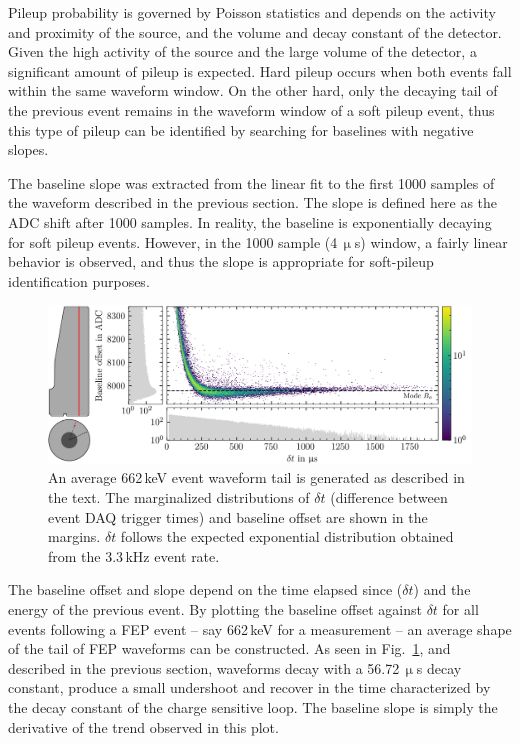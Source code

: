 Pileup probability is governed by Poisson statistics and depends on the activity and proximity of the source, and the volume and decay constant of the detector. Given the high activity of the \CsS{} source and the large volume of the detector, a significant amount of pileup is expected. Hard pileup occurs when both events fall within the same waveform window. On the other hard, only the decaying tail of the previous event remains in the waveform window of a soft pileup event, thus this type of pileup can be identified by searching for baselines with negative slopes.

The baseline slope was extracted from the linear fit to the first 1000 samples of the waveform described in the previous section. The slope is defined here as the ADC shift after 1000 samples. In reality, the baseline is exponentially decaying for soft pileup events. However, in the 1000 sample (4\,$\upmu$s) window, a fairly linear behavior is observed, and thus the slope is appropriate for soft-pileup identification purposes. 
\begin{figure}[htb]
    \centering
    \includegraphics[width=6in]{figs/param/dt_offset_maginalized_6_9in.png}
    \caption{An average 662\,keV event waveform tail is generated as described in the text. The marginalized distributions of $\delta t$ (difference between event DAQ trigger times) and baseline offset are shown in the margins. $\delta t$ follows the expected exponential distribution obtained from the 3.3\,kHz event rate.}
    \label{fig:time_vs_offset}
\end{figure}

The baseline offset and slope depend on the time elapsed since ($\delta t$) and the energy of the previous event. By plotting the baseline offset against $\delta t$ for all events following a FEP event -- say 662\,keV for a \CsS{} measurement -- an average shape of the tail of FEP waveforms can be constructed. As seen in Fig.~\ref{fig:time_vs_offset}, and described in the previous section, waveforms decay with a 56.72\,$\upmu$s decay constant, produce a small undershoot and recover in the time characterized by the decay constant of the charge sensitive loop. The baseline slope is simply the derivative of the trend observed in this plot. 

